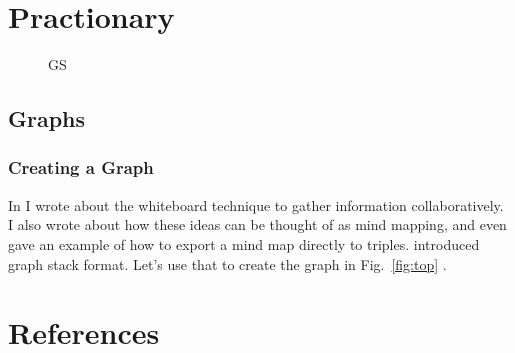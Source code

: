 \clearpage

\section{Practionary}\label{practionary}

\begin{wrapfigure}[80]{r}{0pt}

\centering 

\caption{GS}\label{fig:gs}

\end{wrapfigure}

\subsection{Graphs}\label{graphs}

\subsubsection{Creating a Graph}\label{creating-a-graph}

In \tsa I wrote about the whiteboard technique to gather information
collaboratively. I also wrote about how these ideas can be thought of as
mind mapping, and even gave an example of how to export a mind map
directly to triples. \trs introduced graph stack format. Let's use that
to create the graph in Fig.~\ref{fig:top} .

\lipsum

\vspace{10pt}

\label{lst:mod}%
\begin{Shaded}
\begin{Highlighting}[numbers=left,,]

\end{Highlighting}
\end{Shaded}


\clearpage

\section{References}\label{references}

